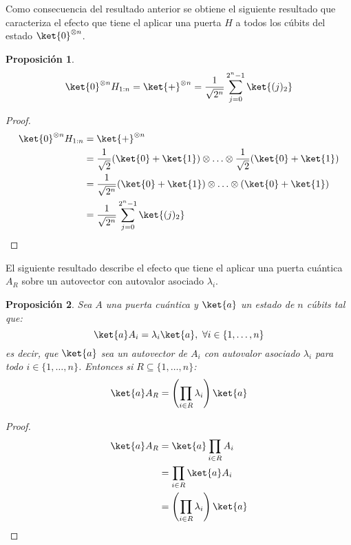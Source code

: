 \documentclass[10pt,conference,a4paper]{IEEEtran}
\newtheorem{prop}{Proposición}[section]
\begin{document}
\vspace{1.5mm}
Como consecuencia del resultado anterior se obtiene el siguiente resultado que caracteriza el efecto que tiene el aplicar una puerta $H$ a todos los cúbits del estado $\ket{0}^{\otimes n}$.
\vspace{1.5mm}
\begin{prop}
    \begin{equation}
        \ket{0}^{\otimes n} H_{1:n}=\ket{+}^{\otimes n}=\dfrac{1}{\sqrt{2^n}}\displaystyle\sum_{j=0}^{2^n-1}\ket{(j)_2}
    \end{equation}
    \label{prop:3}
\end{prop}
\begin{proof}
\begin{align*}
    \ket{0}^{\otimes n}H_{1:n}&=\ket{+}^{\otimes n}\\
    &=\dfrac{1}{\sqrt{2}}(\ket{0}+\ket{1})\otimes\ldots\otimes\dfrac{1}{\sqrt{2}}(\ket{0}+\ket{1})\\
    &=\dfrac{1}{\sqrt{2^n}}(\ket{0}+\ket{1})\otimes\ldots\otimes(\ket{0}+\ket{1})\\
    &=\dfrac{1}{\sqrt{2^n}}\displaystyle\sum_{j=0}^{2^n-1}\ket{(j)_2}
\end{align*}    
\end{proof}
\vspace{1.5mm}
El siguiente resultado describe el efecto que tiene el aplicar una puerta cuántica $A_R$ sobre un autovector con autovalor asociado $\lambda_i$.
\vspace{1.5mm}
\begin{prop}
    Sea $A$ una puerta cuántica y $\ket{a}$ un estado de $n$ cúbits tal que:
    $$\ket{a}A_i=\lambda_i\ket{a},\ \forall i\in \{1,\ldots, n\}$$
    es decir, que $\ket{a}$ sea un autovector de $A_i$ con autovalor asociado $\lambda_i$ para todo $i\in \{1,\ldots, n\}$. Entonces si 
    $R\subseteq\{1,\ldots, n\}$:
    \begin{equation}
        \ket{a}A_R=\displaystyle\left(\prod_{i\in R}\lambda_i\right)\ket{a}
    \end{equation}
    \label{prop:3.5}
\end{prop}
\begin{proof}
    \begin{align*}
         \ket{a}A_R&=\ket{a}\displaystyle\prod_{i\in R}A_i\\
         &=\displaystyle\prod_{i\in R}\ket{a}A_i\\
         &=\displaystyle\left(\prod_{i\in R}\lambda_i\right)\ket{a}
    \end{align*}
\end{proof}
\end{document}
